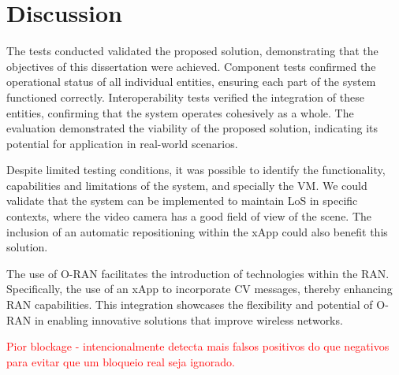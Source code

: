 


\section{Discussion}\label{sec:discuss}
The tests conducted validated the proposed solution, demonstrating that the objectives of this dissertation were achieved.
Component tests confirmed the operational status of all individual entities, ensuring each part of the system functioned correctly.
Interoperability tests verified the integration of these entities, confirming that the system operates cohesively as a whole.
The evaluation demonstrated the viability of the proposed solution, indicating its potential for application in real-world scenarios.

Despite limited testing conditions, it was possible to identify the functionality, capabilities and limitations of the system, and specially the VM\@.
We could validate that the system can be implemented to maintain LoS in specific contexts, where the video camera has a good field of view of the scene.
The inclusion of an automatic repositioning within the xApp could also benefit this solution.

The use of O-RAN facilitates the introduction of technologies within the RAN\@.
Specifically, the use of an xApp to incorporate CV messages, thereby enhancing RAN capabilities.
This integration showcases the flexibility and potential of O-RAN in enabling innovative solutions that improve wireless networks.

\textcolor{red}{Pior blockage - intencionalmente detecta mais falsos positivos do que negativos para evitar que um bloqueio  real seja ignorado.}

